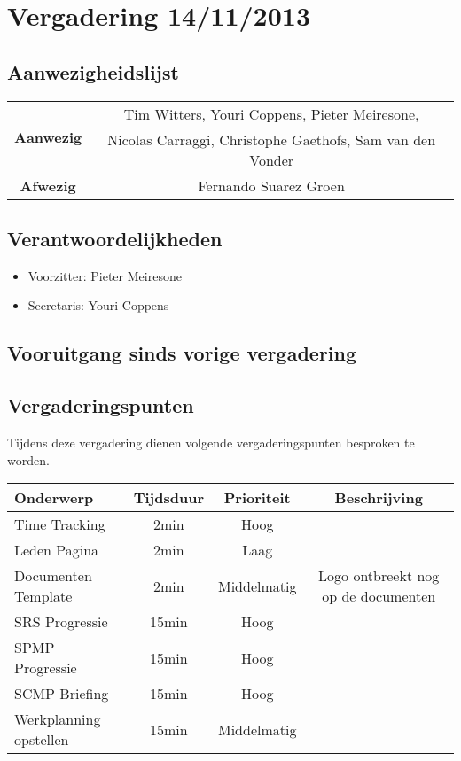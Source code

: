 \section{Vergadering 14/11/2013}
\subsection{Aanwezigheidslijst}
\begin{table}[htbp]
	\centering
	\begin{tabular}{c|c}
		\multirow{2}{*}{\textbf{Aanwezig}} & Tim Witters, Youri Coppens, Pieter Meiresone, \\
		& Nicolas Carraggi,  Christophe Gaethofs, Sam van den Vonder \\
		\hline
		\textbf{Afwezig} & Fernando Suarez Groen\\
	\end{tabular}
\end{table}

\subsection{Verantwoordelijkheden}
\begin{itemize}
	\item Voorzitter: Pieter Meiresone
	\item Secretaris: Youri Coppens 
\end{itemize}

\subsection{Vooruitgang sinds vorige vergadering}
\subsection{Vergaderingspunten}
Tijdens deze vergadering dienen volgende vergaderingspunten besproken te worden.
\begin{table} [H]
	\centering
	\begin{tabular}{l|c|c|c}
		Onderwerp & Tijdsduur & Prioriteit & Beschrijving \\
		\hline
		Time Tracking & 2min & Hoog & \\
		Leden Pagina & 2min & Laag & \\
		Documenten Template & 2min & Middelmatig & Logo ontbreekt nog op de documenten\\
		SRS Progressie & 15min & Hoog & \\
		SPMP Progressie & 15min & Hoog & \\
		SCMP Briefing & 15min & Hoog & \\
		Werkplanning opstellen & 15min & Middelmatig & \\
	\end{tabular}
\end{table}

